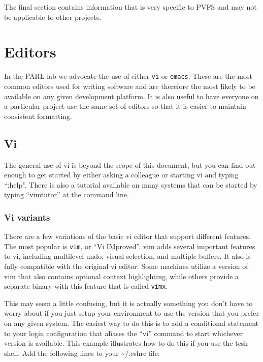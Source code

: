 \documentclass[11pt, letterpaper]{article}
\begin{document}
The final section contains information that is very specific to PVFS
and may not be applicable to other projects.

\section{Editors}

\label{sec:editors}
In the PARL lab we advocate the use of either {\tt vi}
or {\tt emacs}.  These are the most common editors used for writing
software and are therefore the most likely to be available on any given
development platform.  It is also useful to have everyone on a
particular project use the same set of editors so that it is easier to
maintain consistent formatting.

\subsection{Vi}

The
general use of vi is beyond the scope of this document, but you can find
out enough to get started by either asking a colleague or starting vi
and typing ``:help''.  There is also a tutorial available on many systems
that can be started by typing ``vimtutor'' at the command line.

\subsubsection{Vi variants}

There are a few variations of the basic vi editor that support different
features.  The most popular is {\tt vim}, or ``Vi IMproved''.  vim adds
several important features to vi, including multilevel undo, visual
selection, and multiple buffers.  It also is fully compatible with the
original vi editor.  Some machines utilize a version of vim that also
contains optional context highlighting, while others provide a separate
binary with this feature that is called {\tt vimx}.  

This may seem a little confusing, but it is actually something you don't
have to worry about if you just setup your environment to
use the version that you prefer on any given system.  The easiest
way to do this is to add a conditional statement to your login
configuration that aliases the ``vi'' command to start whichever version is 
available.  This example illustrates how to do this if you use
the tcsh shell.  Add the following lines to your \textasciitilde/.cshrc file:
\end{document}
